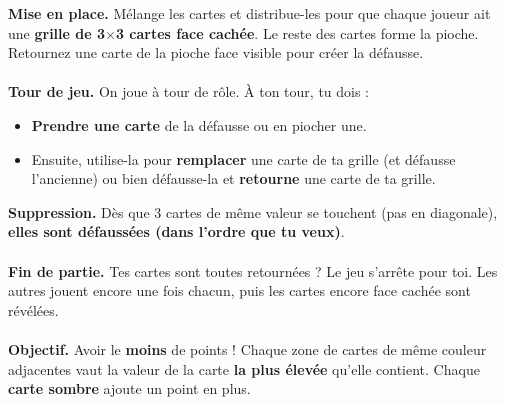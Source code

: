 \documentclass[a4paper]{memoir}
\begin{document}
{\footnotesize

\noindent
\textbf{ Mise en place.} Mélange les cartes et distribue-les pour que chaque joueur ait une \textbf{grille de 3$\times$3 cartes face cachée}. 
Le reste des cartes forme la pioche. Retournez une carte de la pioche face visible pour créer la défausse.
\\
\\
\textbf{ Tour de jeu.} On joue à tour de rôle. À ton tour, tu dois :
\begin{itemize}
    \item \textbf{Prendre une carte} de la défausse ou en piocher une.
    \item Ensuite, utilise-la pour \textbf{remplacer} une carte de ta grille (et défausse l’ancienne) ou bien défausse-la et \textbf{retourne} une carte de ta grille.
\end{itemize}
\textbf{ Suppression.} Dès que 3 cartes de même valeur se touchent (pas en diagonale), \textbf{elles sont défaussées (dans l'ordre que tu veux)}.
\\
\\
\textbf{ Fin de partie.} Tes cartes sont toutes retournées ? Le jeu s'arrête pour toi. 
Les autres jouent encore une fois chacun, puis les cartes encore face cachée sont révélées.
\\
\\
\textbf{ Objectif.} Avoir le \textbf{moins} de points ! 
Chaque zone de cartes de {même couleur adjacentes} vaut la valeur de la carte \textbf{la plus élevée} qu'elle contient.
Chaque \textbf{carte sombre} ajoute un point en plus.
}
\end{document}
